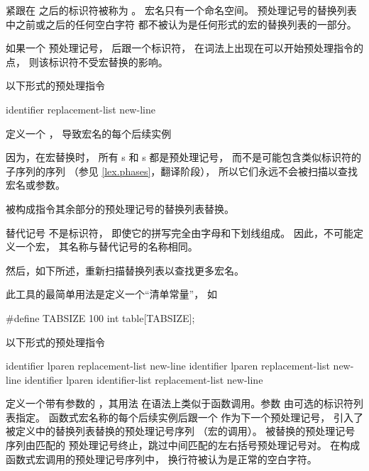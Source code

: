     \pnum
    紧跟在
    之后的标识符被称为
    。
    宏名只有一个命名空间。
    预处理记号的替换列表中之前或之后的任何空白字符
    都不被认为是任何形式的宏的替换列表的一部分。
    
    \pnum
    如果一个
    \tcode{\#}
    预处理记号，
    后跟一个标识符，
    在词法上出现在可以开始预处理指令的点，
    则该标识符不受宏替换的影响。
    
    \pnum
    以下形式的预处理指令
    \begin{ncsimplebnf}
     identifier replacement-list new-line
    \end{ncsimplebnf}
    定义一个
    ，
    导致宏名的每个后续实例
    \begin{footnote}
    因为，在宏替换时，
    所有 s 和 s 都是预处理记号，
    而不是可能包含类似标识符的子序列的序列
    （参见 \ref{lex.phases}，翻译阶段），
    所以它们永远不会被扫描以查找宏名或参数。
    \end{footnote}
    被构成指令其余部分的预处理记号的替换列表替换。
    \begin{footnote}
    替代记号 不是标识符，
    即使它的拼写完全由字母和下划线组成。
    因此，不可能定义一个宏，
    其名称与替代记号的名称相同。
    \end{footnote}
    然后，如下所述，重新扫描替换列表以查找更多宏名。
    
    \pnum
    \begin{example}
    此工具的最简单用法是定义一个“清单常量”，
    如
    \begin{codeblock}
    #define TABSIZE 100
    int table[TABSIZE];
    \end{codeblock}
    \end{example}
    
    \pnum
    以下形式的预处理指令
    \begin{ncsimplebnf}
     identifier lparen  \terminal{)} replacement-list new-line\br
     identifier lparen  \terminal{)} replacement-list new-line\br
     identifier lparen identifier-list  \terminal{)} replacement-list new-line
    \end{ncsimplebnf}
    定义一个带有参数的 ，其用法
    在语法上类似于函数调用。参数
    由可选的标识符列表指定。
    函数式宏名称的每个后续实例后跟一个
    \tcode{(}
    作为下一个预处理记号，
    引入了被定义中的替换列表替换的预处理记号序列
    （宏的调用）。
    被替换的预处理记号序列由匹配的
    \tcode{)}
    预处理记号终止，跳过中间匹配的左右括号预处理记号对。
    在构成函数式宏调用的预处理记号序列中，
    换行符被认为是正常的空白字符。
    
